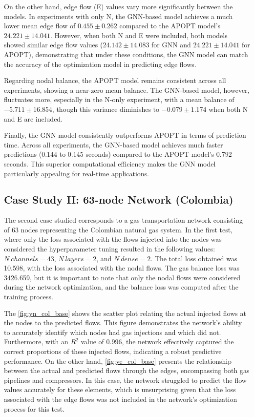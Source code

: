 On the other hand, edge flow (E) values vary more significantly between the models. In experiments with only N, the GNN-based model achieves a much lower mean edge flow of \(0.455 \pm 0.262\) compared to the APOPT model’s \(24.221 \pm 14.041\). However, when both N and E were included, both models showed similar edge flow values (\(24.142 \pm 14.083\) for GNN and \(24.221 \pm 14.041\) for APOPT), demonstrating that under these conditions, the GNN model can match the accuracy of the optimization model in predicting edge flows.


Regarding nodal balance, the APOPT model remains consistent across all experiments, showing a near-zero mean balance. The GNN-based model, however, fluctuates more, especially in the N-only experiment, with a mean balance of \(-5.711 \pm 16.854\), though this variance diminishes to \(-0.079 \pm 1.174\) when both N and E are included.

Finally, the GNN model consistently outperforms APOPT in terms of prediction time. Across all experiments, the GNN-based model achieves much faster predictions (\(0.144\) to \(0.145\) seconds) compared to the APOPT model’s \(0.792\) seconds. This superior computational efficiency makes the GNN model particularly appealing for real-time applications.




\subsection{Case Study II: 63-node Network (Colombia)}


The second case studied corresponds to a gas transportation network consisting of 63 nodes representing the Colombian natural gas system. In the first test, where only the loss associated with the flows injected into the nodes was considered the hyperparameter tuning resulted in the following values: $N \ channels = 43$, $N \ layers = 2$, and $N \ dense = 2$. The total loss obtained was 10.598, with the loss associated with the nodal flows. The gas balance loss was 3426.659, but it is important to note that only the nodal flows were considered during the network optimization, and the balance loss was computed after the training process.

The \cref{fig:yn_col_base} shows the scatter plot relating the actual injected flows at the nodes to the predicted flows. This figure demonstrates the network's ability to accurately identify which nodes had gas injections and which did not. Furthermore, with an $R^2$ value of 0.996, the network effectively captured the correct proportions of these injected flows, indicating a robust predictive performance. 
On the other hand, \cref{fig:ye_col_base} presents the relationship between the actual and predicted flows through the edges, encompassing both gas pipelines and compressors. In this case, the network struggled to predict the flow values accurately for these elements, which is unsurprising given that the loss associated with the edge flows was not included in the network's optimization process for this test.

